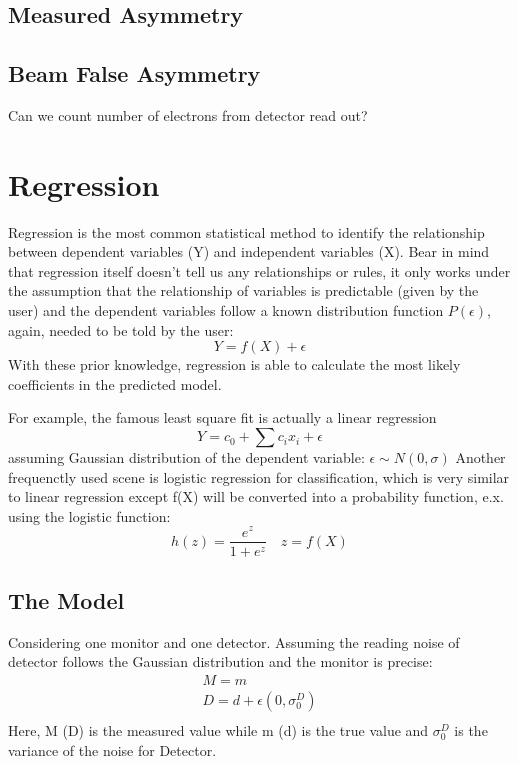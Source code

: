 \subsection{Measured Asymmetry}
\subsection{Beam False Asymmetry}

Can we count number of electrons from detector read out?

\section{Regression}
Regression is the most common statistical method to identify the relationship
between dependent variables (Y) and independent variables (X). Bear in mind that 
regression itself doesn't tell us any relationships or rules, it only works under
the assumption that the relationship of variables is predictable (given by the user) 
and the dependent variables follow a known distribution function $P(\epsilon)$, 
again, needed to be told by the user:
$$ Y = f(X) + \epsilon $$
With these prior knowledge, regression is able to calculate the most likely 
coefficients in the predicted model.

For example, the famous least square fit is actually a linear regression 
$$ Y = c_0 + \sum c_i x_i + \epsilon $$
assuming Gaussian distribution of the dependent variable: $\epsilon \sim N(0, \sigma)$
Another frequenctly used scene is logistic regression for classification, which
is very similar to linear regression except f(X) will be converted into a
probability function, e.x. using the logistic function:
$$ h(z) = \frac{e^z}{1 + e^z} \quad z = f(X) $$

\subsection{The Model}
Considering one monitor and one detector. Assuming the reading noise of detector
follows the Gaussian distribution and the monitor is precise:
\begin{equation*}
    \begin{gathered}
	M = m	\\
	D = d + \epsilon(0, \sigma_0^D)    \\
    \end{gathered}
\end{equation*}
Here, M (D) is the measured value while m (d) is the true value and $\sigma_0^D$ 
is the variance of the noise for Detector.

